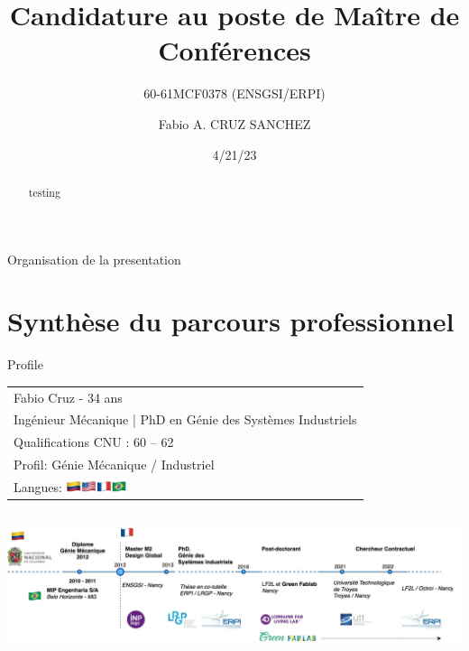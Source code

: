 \documentclass[
  11pt,
  ignorenonframetext,
  aspectratio=169,
  c]{beamer}
\title{Candidature au poste de Maître de Conférences}
\subtitle{60-61MCF0378 (ENSGSI/ERPI)}
\author{Fabio A. CRUZ SANCHEZ}
\date{4/21/23}
\institute{Section CNU 60}
\begin{document}
\frame{\titlepage}
\begin{abstract}
testing
\end{abstract}
\ifdefined\Shaded\renewenvironment{Shaded}{\begin{tcolorbox}[interior hidden, borderline west={3pt}{0pt}{shadecolor}, enhanced, boxrule=0pt, sharp corners, breakable, frame hidden]}{\end{tcolorbox}}\fi

\begin{frame}[plain]{Organisation de la presentation}
\protect\hypertarget{organisation-de-la-presentation}{}
\tableofcontents[hideallsubsections]

\end{frame}

\hypertarget{synthuxe8se-du-parcours-professionnel}{%
\section{Synthèse du parcours
professionnel}\label{synthuxe8se-du-parcours-professionnel}}

\begin{frame}[t]{Profile}
\protect\hypertarget{profile}{}
\extrarowsep=-1.5pt
\begin{tabu} to 
Fabio Cruz - 34 ans  \\
Ingénieur Mécanique | PhD en Génie des Systèmes Industriels \\
Qualifications CNU : 60 – 62 \\
Profil:  Génie Mécanique / Industriel\\
Langues: \includegraphics[width=50pt]{Figures/slides/Langues.jpg}


\end{tabu}

\begin{columns}[T]
\begin{column}[c]{1\textwidth}
\includegraphics{Figures/slides/Fabio-timeline-Parcours.jpg}
\end{column}
\end{columns}

\note{}
\end{frame}
\end{document}
